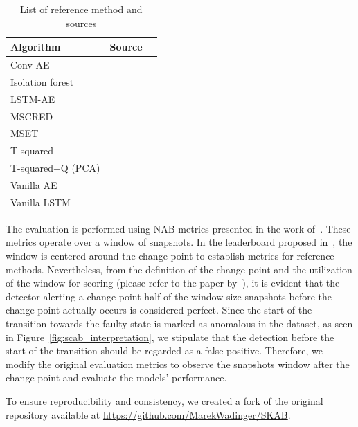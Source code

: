 \begin{table}[H]
	\caption{List of reference method and sources}\label{table:comparison-models}
	\centering
	\begin{tabular}{l l S[table-format=3.0]}
		\toprule
		\textbf{Algorithm} & \textbf{Source}       \\
		\midrule
		Conv-AE            & \citet{Pavithra2020}  \\
		Isolation forest   & \citet{Liu2008}       \\
		LSTM-AE            & \citet{Chollet2016}   \\
		MSCRED             & \citet{ZhangCh2019}   \\
		MSET               & \citet{Gross2000}     \\
		T-squared          & \citet{Hotelling1947} \\
		T-squared+Q (PCA)  & \citet{JoeQin2003}    \\
		Vanilla AE         & \citet{Chen2017}      \\
		Vanilla LSTM       & \citet{Filonov2016}   \\
		\bottomrule
	\end{tabular}
\end{table}

The evaluation is performed using NAB metrics presented in the work of~\citet{Ahmad2017}. These metrics operate over a window of snapshots. In the leaderboard proposed in~\citet{Katser2020}, the window is centered around the change point to establish metrics for reference methods. Nevertheless, from the definition of the change-point and the utilization of the window for scoring (please refer to the paper by~\citet{Lavin2015}), it is evident that the detector alerting a change-point half of the window size snapshots before the change-point actually occurs is considered perfect. Since the start of the transition towards the faulty state is marked as anomalous in the dataset, as seen in Figure~\ref{fig:scab_interpretation}, we stipulate that the detection before the start of the transition should be regarded as a false positive. Therefore, we modify the original evaluation metrics to observe the snapshots window after the change-point and evaluate the models' performance.

To ensure reproducibility and consistency, we created a fork of the original repository available at \url{https://github.com/MarekWadinger/SKAB}.

